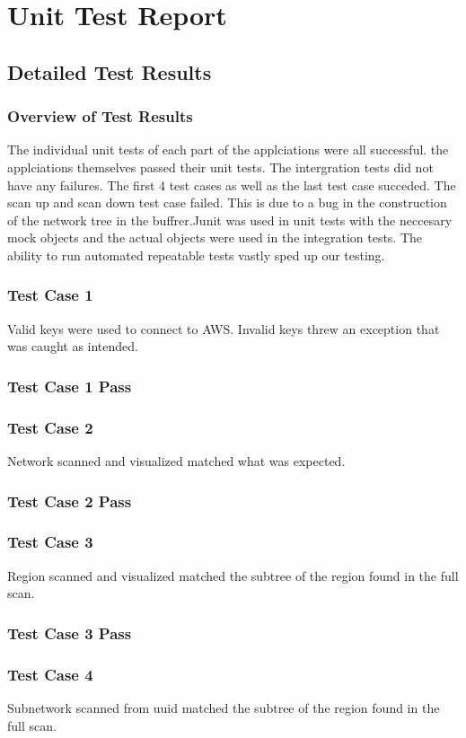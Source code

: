 \documentclass[hidelinks,a4paper,12pt]{article}
\begin{document}
\section{Unit Test Report}

\subsection{Detailed Test Results}
\subsubsection{Overview of Test Results}
The individual unit tests of each part of the applciations were all successful. the applciations themselves passed their unit tests. The intergration tests did not have any failures. The first 4  test cases as well as the last test case succeded. The scan up and scan down test case failed. This is due to a bug in the construction of the network tree in the buffrer.Junit was used in unit tests with the neccesary mock objects and the actual objects were used in the integration tests. The ability to run automated repeatable tests vastly sped up our testing.
\subsubsection{Test Case 1}
Valid keys were used to connect to AWS. Invalid keys threw an exception that was caught as intended.
\subsubsection{Test Case 1 Pass}
\subsubsection{Test Case 2}
Network scanned and visualized matched what was expected.
\subsubsection{Test Case 2 Pass}
\subsubsection{Test Case 3}
Region scanned and visualized matched the subtree of the region found in the full scan.
\subsubsection{Test Case 3 Pass}
\subsubsection{Test Case 4}
Subnetwork scanned from uuid matched the subtree of the region found in the full scan.
\end{document}
